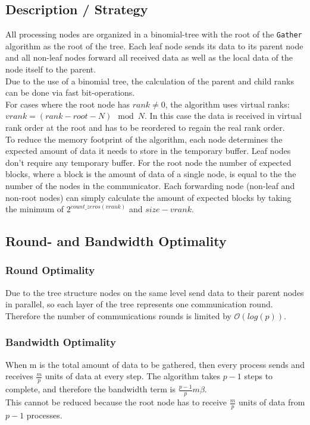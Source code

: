 \subsection{Description / Strategy}

All processing nodes are organized in a binomial-tree with the root of the \texttt{Gather} algorithm as the root of the tree. Each leaf node sends its data to its parent node and all non-leaf nodes forward all received data as well as the local data of the node itself to the parent. \\
Due to the use of a binomial tree, the calculation of the parent and child ranks can be done via fast bit-operations.\\

\noindent For cases where the root node has $rank \neq 0$, the algorithm uses virtual ranks:
$vrank = (rank - root - N ) \mod N$. In this case the data is received in virtual rank order at the root and has to be reordered to regain the real rank order.\\

\noindent To reduce the memory footprint of the algorithm, each node determines the expected amount of data it needs to store in the temporary buffer. Leaf nodes don't require any temporary buffer. For the root node the number of expected blocks, where a block is the amount of data of a single node, is equal to the the number of the nodes in the communicator. Each forwarding node (non-leaf and non-root nodes) can simply calculate the amount of expected blocks by taking the minimum of 
$2^{count\_zeros(vrank)}$ and $size - vrank$.

\subsection{Round- and Bandwidth Optimality}

\subsubsection{Round Optimality}
Due to the tree structure nodes on the same level send data to their parent nodes in parallel, so each layer of the tree represents one communication round. Therefore the number of communications rounds is limited by $\mathcal{O}(log(p))$.

\subsubsection{Bandwidth Optimality}
When m is the total amount of data to be gathered, then every process sends and receives $\frac{m}{p}$ units of data at every step. The algorithm takes $p-1$ steps to complete, and therefore the bandwidth term is $\frac{p-1}{p} m \beta$.\\
This cannot be reduced because the root node has to receive $\frac{m}{p}$ units of data from $p-1$ processes.

